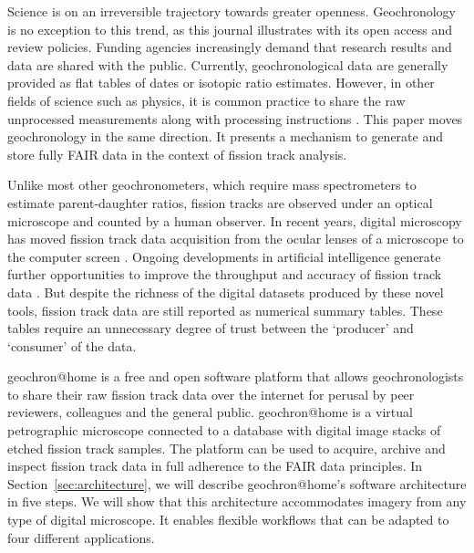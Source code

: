 \documentclass[gchron, manuscript]{copernicus}
\begin{document}
\introduction\label{sec:intro}

Science is on an irreversible trajectory towards greater
openness. Geochronology is no exception to this trend, as this journal
illustrates with its open access and review policies. Funding agencies
increasingly demand that research results and data are shared with the
public. Currently, geochronological data are generally provided as
flat tables of dates or isotopic ratio estimates. However, in other
fields of science such as physics, it is common practice to share the
raw unprocessed measurements along with processing instructions
\citep[e.g.,][]{abbott2016}. This paper moves geochronology in the
same direction. It presents a mechanism to generate and store fully
FAIR \citep[Findable, Accessible, Interoperable and
  Reproducible;][]{wilkinson2016} data in the context of fission track
analysis.\medskip

Unlike most other geochronometers, which require mass spectrometers to
estimate parent-daughter ratios, fission tracks are observed under an
optical microscope and counted by a human observer.  In recent years,
digital microscopy has moved fission track data acquisition from the
ocular lenses of a microscope to the computer screen
\citep{gleadow2009, vanranst2019, gleadow2019}. Ongoing developments
in artificial intelligence generate further opportunities to improve
the throughput and accuracy of fission track data
\citep{nachtergaele2020,li2022,ren2023,boone2025}. But despite the
richness of the digital datasets produced by these novel tools,
fission track data are still reported as numerical summary
tables. These tables require an unnecessary degree of trust between
the `producer' and `consumer' of the data.\medskip

geochron@home is a free and open software platform that allows
geochronologists to share their raw fission track data over the
internet for perusal by peer reviewers, colleagues and the general
public. geochron@home is a virtual petrographic microscope connected to a
database with digital image stacks of etched fission track
samples. The platform can be used to acquire, archive and inspect
fission track data in full adherence to the FAIR data principles. In
Section~\ref{sec:architecture}, we will describe geochron@home's software
architecture in five steps. We will show that this architecture
accommodates imagery from any type of digital microscope. It enables
flexible workflows that can be adapted to four different
applications.\medskip
\end{document}
